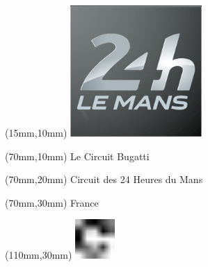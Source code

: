\null\newpage
\begin{textblock*}{50mm}(15mm,10mm)%
\includegraphics[width=50mm]{LG/2015-05-20_00084.png}
\end{textblock*}
\begin{textblock*}{130mm}(70mm,10mm)%
{\fontsize{20}{20}\selectfont Le Circuit Bugatti}\\
\end{textblock*}
\begin{textblock*}{120mm}(70mm,20mm)%
{\fontsize{16}{16}\selectfont Circuit des 24 Heures du Mans}\\
\end{textblock*}
\begin{textblock*}{120mm}(70mm,30mm)%
{\fontsize{12}{12}\selectfont France}
\end{textblock*}
\begin{textblock*}{30mm}(110mm,30mm)%
\centering
\includegraphics[height=15mm]{icons/fa-rotate-right.pdf}
\end{textblock*}
